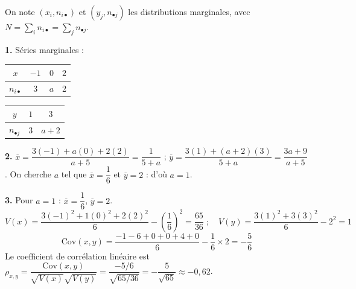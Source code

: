 \documentclass[11pt]{article}
\begin{document}
On note $(x_i, n_{i\bullet})$ et $(y_j, n_{\bullet j})$ les distributions marginales, avec $N = \sum_i n_{i\bullet} = \sum_j n_{\bullet j}$.

\textbf{1.} Séries marginales :
\begin{center}\renewcommand{\arraystretch}{1.3}
\begin{tabular}{|c|c|c|c|}\hline $x$ & $-1$ & $0$ & $2$ \\\hline $n_{i\bullet}$ & 3 & $a$ & 2 \\\hline\end{tabular}\qquad
\begin{tabular}{|c|c|c|}\hline $y$ & $1$ & $3$ \\\hline $n_{\bullet j}$ & 3 & $a+2$ \\\hline\end{tabular}
\end{center}

\textbf{2.} $\overline{x} = \dfrac{3(-1) + a(0) + 2(2)}{a + 5} = \dfrac{1}{5 + a}$ ; $\overline{y} = \dfrac{3(1) + (a+2)(3)}{5 + a} = \dfrac{3a + 9}{a + 5}$. On cherche $a$ tel que $\overline{x} = \dfrac{1}{6}$ et $\overline{y} = 2$ : d'où $a = 1$.

\textbf{3.} Pour $a = 1$ : $\overline{x} = \dfrac{1}{6}$, $\overline{y} = 2$.
\[ V(x) = \frac{3(-1)^2 + 1(0)^2 + 2(2)^2}{6} - \left(\frac{1}{6}\right)^2 = \frac{65}{36} \;;\quad V(y) = \frac{3(1)^2 + 3(3)^2}{6} - 2^2 = 1 \]
\[ \mathrm{Cov}(x,y) = \frac{-1 - 6 + 0 + 0 + 4 + 0}{6} - \frac{1}{6}\times 2 = -\frac{5}{6} \]
Le coefficient de corrélation linéaire est $\rho_{x,y} = \dfrac{\mathrm{Cov}(x,y)}{\sqrt{V(x)}\sqrt{V(y)}} = \dfrac{-5/6}{\sqrt{65/36}} = -\dfrac{5}{\sqrt{65}} \approx -0{,}62$.
\end{document}
